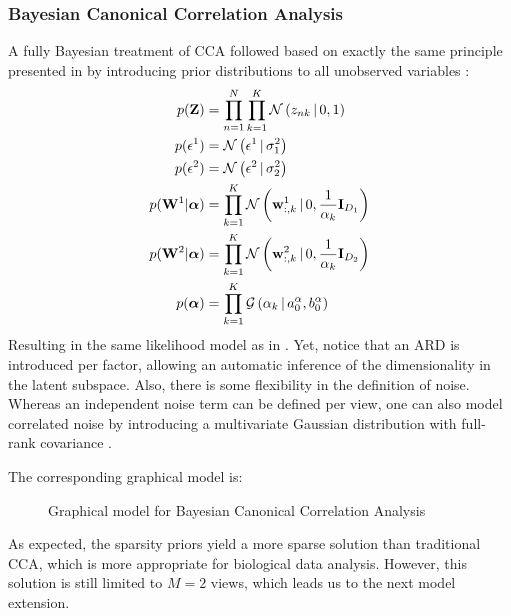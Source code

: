\subsubsection{Bayesian Canonical Correlation Analysis} \label{section:bayesian_cca}

A fully Bayesian treatment of CCA followed based on exactly the same principle presented in  by introducing prior distributions to all unobserved variables \cite{Wang2007,Klami2013}:
\begin{align*} 
	p({\bf Z}) &= \prod_{n=1}^{N} \prod_{k=1}^{K} \mathcal{N}\left(z_{nk} \,|\, 0,1\right) \\
	p(\epsilon^{1}) &= \mathcal{N}\left(\epsilon^{1} \,|\, \sigma_{1}^{2}\right) \\
	p(\epsilon^{2}) &= \mathcal{N}\left(\epsilon^{2} \,|\, \sigma_{2}^{2}\right) \\
	p({\bf W}^1|\mbox{\boldmath $\alpha$}) &= \prod_{k=1}^{K} \mathcal{N}\left({\bf w}^{1}_{:,k} \,|\, 0,\frac{1}{\alpha_{k}}{\bf I}_{D_1}\right) \\
	p({\bf W}^2|\mbox{\boldmath $\alpha$}) &= \prod_{k=1}^{K} \mathcal{N}\left({\bf w}^{2}_{:,k} \,|\, 0,\frac{1}{\alpha_{k}}{\bf I}_{D_2}\right) \\
	p(\mbox{\boldmath $\alpha$}) &= \prod_{k=1}^{K} \mathcal{G}\left(\alpha_k \,|\, a_0^\alpha, b_0^\alpha\right)
\end{align*}
Resulting in the same likelihood model as in . Yet, notice that an ARD is introduced per factor, allowing an automatic inference of the dimensionality in the latent subspace.
Also, there is some flexibility in the definition of noise. Whereas an independent noise term can be defined per view, one can also model correlated noise by introducing a multivariate Gaussian distribution with full-rank covariance \cite{Wang2007,Klami2013}.

The corresponding graphical model is:
\begin{figure}[H] \begin{center}
	
	\label{fig:graphical_bayesianCCA}
	\caption{Graphical model for Bayesian Canonical Correlation Analysis}
\end{center} \end{figure}

As expected, the sparsity priors yield a more sparse solution than traditional CCA, which is more appropriate for biological data analysis. However, this solution is still limited to $M=2$ views, which leads us to the next model extension.



